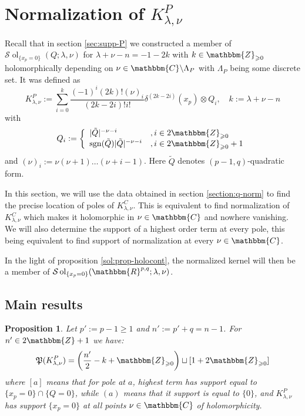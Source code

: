 \documentclass{article}
\newcommand{\assign}{:=}
\newcommand{\tmop}[1]{\ensuremath{\operatorname{#1}}}
\numberwithin{definition}{section}
\numberwithin{lemma}{section}
\newtheorem{proposition}{Proposition}
\numberwithin{proposition}{section}
{\theorembodyfont{\rmfamily}\newtheorem{remark}{Remark}
\numberwithin{remark}{section}
}
\begin{document}
\section{Normalization of $K_{\lambda, \nu}^P$}\label{sec:KP-normalization}

Recall that in section \ref{sec:supp-P} we constructed a member of
$\mathcal{S} \tmop{ol}_{\{ x_p = 0 \}} ( Q ; \lambda, \nu)$ for $\lambda + \nu
- n = - 1 - 2 k$ with $k \in \mathbbm{Z}_{\geqslant 0}$ holomorphically
depending on $\nu \in \mathbbm{C}\backslash \Lambda_P$ with $\Lambda_P$ being
some discrete set. It was defined as
\begin{equation}
  K_{\lambda, \nu}^P \assign \sum_{i = 0}^k \frac{( - 1)^i ( 2 k) ! (
  \nu)_i}{( 2 k - 2 i) !i!} \delta^{( 2 k - 2 i)} ( x_p) \otimes Q_i,
  \hspace{1em} k \assign \lambda + \nu - n
\end{equation}
with
\[ Q_i \assign \left\{ \begin{array}{ll}
     | \tilde{Q} |^{- \nu - i} & , i \in 2\mathbbm{Z}_{\geqslant 0}\\
     \tmop{sgn} ( \tilde{Q}) | \tilde{Q} |^{- \nu - i} & , i \in
     2\mathbbm{Z}_{\geqslant 0} + 1
   \end{array} \right. \]
and $( \nu)_i \assign \nu ( \nu + 1) \ldots ( \nu + i - 1)$. Here
$\tilde{Q}$ denotes $( p - 1, q)$-quadratic form.

In this section, we will use the data obtained in section \ref{section:q-norm}
to find the precise location of poles of $K_{\lambda, \nu}^C$. This is
equivalent to find normalization of $K_{\lambda, \nu}^C$ which makes it
holomorphic in $\nu \in \mathbbm{C}$ and nowhere vanishing. We will also
determine the support of a highest order term at every pole, this being
equivalent to find support of normalization at every $\nu \in \mathbbm{C}$.

In the light of proposition \ref{sol:prop-holocont}, the normalized kernel
will then be a member of $\mathcal{S} \tmop{ol}_{\{ x_p = 0 \}} (
\mathbbm{R}^{p, q} ; \lambda, \nu)$.

\subsection{Main results}

\begin{proposition}
  \label{KP-normalization-2:prop-1}Let $p' \assign p - 1 \geqslant 1$ and $n'
  \assign p' + q = n - 1$. For $n' \in 2\mathbbm{Z}+ 1$ we have:
  \[ \mathfrak{P} ( K_{\lambda, \nu}^P) = \left( \frac{n'}{2} - k
     +\mathbbm{Z}_{\geqslant 0} \right) \sqcup [ 1 + 2\mathbbm{Z}_{\geqslant
     0}] \]
  where $[ a]$ means that for pole at $a$, highest term has support equal to
  $\{ x_p = 0 \} \cap \{ Q = 0 \}$, while $( a)$ means that it support is
  equal to $\{ 0 \}$, and $K_{\lambda, \nu}^P$ has support $\{ x_p = 0 \}$ at
  all points $\nu \in \mathbbm{C}$ of holomorphicity.
\end{proposition}
\end{document}
